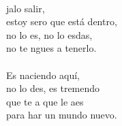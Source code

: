 \begin{cancion}
\begin{chorus}
\jump\\
	jalo salir,\\
	estoy sero que está dentro,\\
	no lo es, no lo esdas,\\
	no te ngues a tenerlo.\\
\jump\\
	Es naciendo aquí,\\
	no lo des, es tremendo\\
	que te a que le aes\\
	para har un mundo nuevo.\\
	\end{chorus}%
	\jump\\
\end{cancion}%
